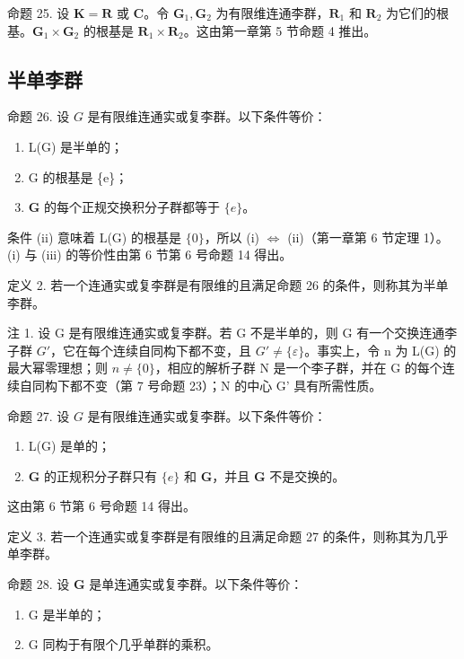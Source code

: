 命题 25. 设 \(\mathbf{K} = \mathbf{R}\) 或 \(\mathbf{C}\)。令 \(\mathbf{G}_1, \mathbf{G}_2\) 为有限维连通李群，\(\mathbf{R}_1\) 和 \(\mathbf{R}_2\) 为它们的根基。\(\mathbf{G}_1 \times \mathbf{G}_2\) 的根基是 \(\mathbf{R}_1 \times \mathbf{R}_2\)。这由第一章第 5 节命题 4 推出。

\subsection{半单李群}

命题 26. 设 \(G\) 是有限维连通实或复李群。以下条件等价：

\begin{enumerate}
\def\labelenumi{(\roman{enumi})}
\item
  L(G) 是半单的；
\item
  G 的根基是 \{e\}；
\item
  \(\mathbf{G}\) 的每个正规交换积分子群都等于 \(\{e\}\)。
\end{enumerate}

条件 (ii) 意味着 L(G) 的根基是 \(\{0\}\)，所以 (i) \(\Leftrightarrow\) (ii)（第一章第 6 节定理 1）。(i) 与 (iii) 的等价性由第 6 节第 6 号命题 14 得出。

定义 2. 若一个连通实或复李群是有限维的且满足命题 26 的条件，则称其为半单李群。

注 1. 设 G 是有限维连通实或复李群。若 G 不是半单的，则 G 有一个交换连通李子群 \(G'\)，它在每个连续自同构下都不变，且 \(G' \neq \{\varepsilon\}\)。事实上，令 n 为 L(G) 的最大幂零理想；则 \(n \neq \{0\}\)，相应的解析子群 N 是一个李子群，并在 G 的每个连续自同构下都不变（第 7 号命题 23）；N 的中心 G' 具有所需性质。

命题 27. 设 \(G\) 是有限维连通实或复李群。以下条件等价：

\begin{enumerate}
\def\labelenumi{(\roman{enumi})}
\item
  L(G) 是单的；
\item
  \(\mathbf{G}\) 的正规积分子群只有 \(\{e\}\) 和 \(\mathbf{G}\)，并且 \(\mathbf{G}\) 不是交换的。
\end{enumerate}

这由第 6 节第 6 号命题 14 得出。

定义 3. 若一个连通实或复李群是有限维的且满足命题 27 的条件，则称其为几乎单李群。

命题 28. 设 \(\mathbf{G}\) 是单连通实或复李群。以下条件等价：

\begin{enumerate}
\def\labelenumi{(\roman{enumi})}
\item
  G 是半单的；
\item
  G 同构于有限个几乎单群的乘积。
\end{enumerate}

